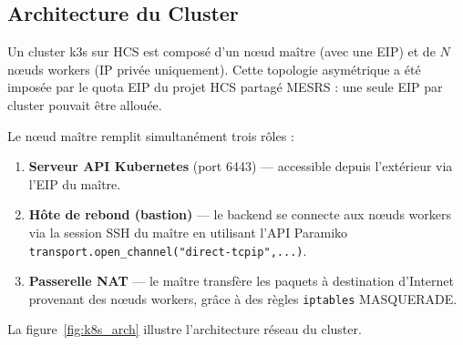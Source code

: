 \subsection{Architecture du Cluster}

Un cluster k3s sur HCS est composé d'un nœud maître (avec une EIP) et de $N$ nœuds
workers (IP privée uniquement). Cette topologie asymétrique a été imposée par le quota
EIP du projet HCS partagé MESRS : une seule EIP par cluster pouvait être allouée.

Le nœud maître remplit simultanément trois rôles :
\begin{enumerate}
  \item \textbf{Serveur API Kubernetes} (port 6443) --- accessible depuis l'extérieur
        via l'EIP du maître.
  \item \textbf{Hôte de rebond (bastion)} --- le backend se connecte aux nœuds workers
        via la session SSH du maître en utilisant l'API Paramiko
        \texttt{transport.open\_channel("direct-tcpip",...)}.
  \item \textbf{Passerelle NAT} --- le maître transfère les paquets à destination
        d'Internet provenant des nœuds workers, grâce à des règles
        \texttt{iptables} MASQUERADE.
\end{enumerate}

La figure~\ref{fig:k8s_arch} illustre l'architecture réseau du cluster.

